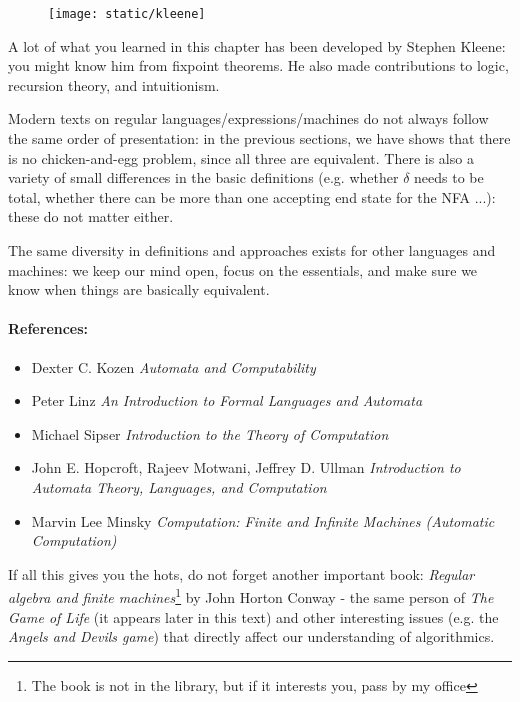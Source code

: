 \setlength{\intextsep}{0pt}
\begin{figure}
\texttt{[image: static/kleene]}
\end{figure}


A lot of what you learned in this chapter has been developed by
Stephen Kleene: you might know him from fixpoint theorems. He also made contributions to logic, recursion theory, and intuitionism.

Modern texts on regular languages/expressions/machines do not always
follow the same order of presentation: in the previous sections, we
have shows that there is no chicken-and-egg problem, since all three
are equivalent. There is also a variety of small differences in the
basic definitions (e.g. whether $\delta$ needs to be total, whether
there can be more than one accepting end state for the NFA ...): these
do not matter either.

The same diversity in definitions and approaches exists for other
languages and machines: we keep our mind open, focus on the
essentials, and make sure we know when things are basically
equivalent.



\paragraph{References:}

\begin{itemize}
\item
Dexter C. Kozen  {\em Automata and Computability}

\item
Peter Linz {\em An Introduction to Formal Languages and Automata}

\item
Michael Sipser {\em Introduction to the Theory of Computation}

\item
John E. Hopcroft, Rajeev Motwani, Jeffrey D. Ullman
{\em Introduction to Automata Theory, Languages, and Computation}

\item
Marvin Lee Minsky {\em Computation: Finite and Infinite Machines
(Automatic Computation)}
\end{itemize}

If all this gives you the hots, do not forget another important
book: {\em Regular algebra and finite machines}\footnote{The book is
  not in the library, but if it interests you, pass by my office} by
John Horton Conway - the same person of {\em The Game of Life} (it
appears later in this text) and other interesting issues (e.g. the
{\em Angels and Devils game}) that directly affect our understanding
of algorithmics.



